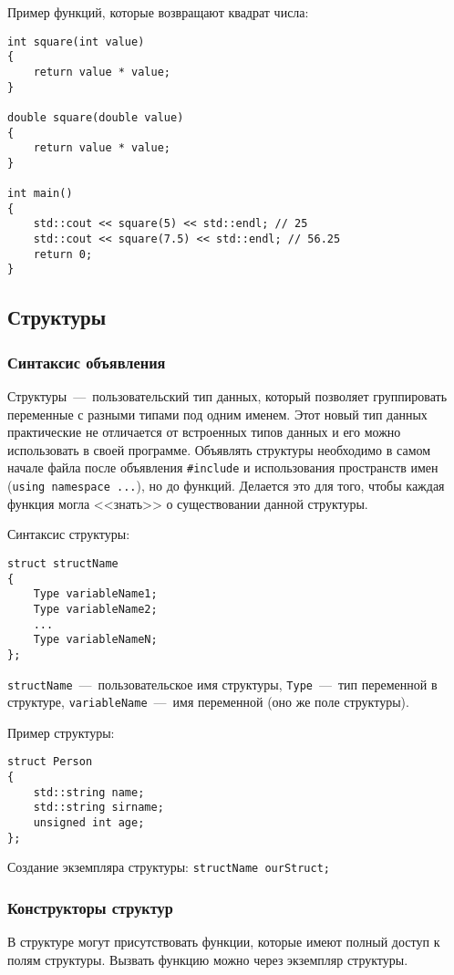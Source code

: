 Пример функций, которые возвращают квадрат числа:
\begin{lstlisting}
int square(int value)
{
    return value * value;
}

double square(double value)
{
    return value * value;
}

int main()
{
    std::cout << square(5) << std::endl; // 25
    std::cout << square(7.5) << std::endl; // 56.25
    return 0;
}
\end{lstlisting}


\subsection{Структуры}
\subsubsection{Синтаксис объявления}
Структуры~---~пользовательский тип данных, который позволяет группировать переменные с разными типами под одним именем. Этот новый тип данных практические не отличается от встроенных типов данных и его можно использовать в своей программе. Объявлять структуры необходимо в самом начале файла после объявления \lstinline|#include| и использования пространств имен (\lstinline|using namespace ...|), но до функций. Делается это для того, чтобы каждая функция могла <<знать>> о существовании данной структуры.

Синтаксис структуры:
\begin{lstlisting}
struct structName
{
    Type variableName1;
    Type variableName2;
    ...
    Type variableNameN;
};
\end{lstlisting}

\lstinline|structName|~---~пользовательское имя структуры, \lstinline|Type|~---~тип переменной в структуре, \lstinline|variableName|~---~имя переменной (оно же поле структуры).

Пример структуры:
\begin{lstlisting}
struct Person
{
    std::string name;
    std::string sirname;
    unsigned int age;
};
\end{lstlisting}

Создание экземпляра структуры:
\lstinline{structName ourStruct;}

\subsubsection{Конструкторы структур}

В структуре могут присутствовать функции, которые имеют полный доступ к полям структуры. Вызвать функцию можно через экземпляр структуры.

